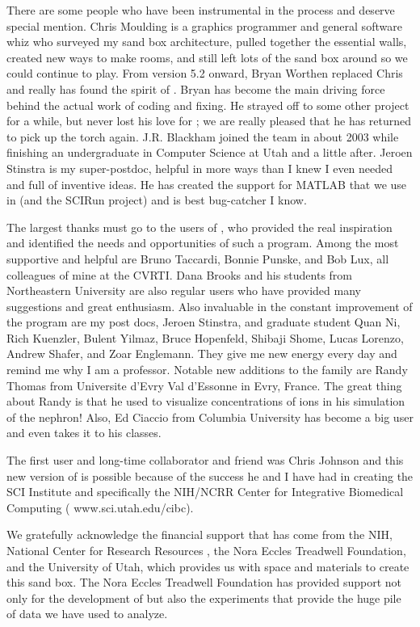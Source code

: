 There are some people who have been instrumental in the process and deserve
special mention.  Chris Moulding is a graphics programmer and general
software whiz who surveyed my sand box architecture, pulled together the
essential walls, created new ways to make rooms, and still left lots of the
sand box around so we could continue to play.  From version 5.2 onward,
Bryan Worthen replaced Chris and really has found the spirit of \map{}.
Bryan has become the main driving force behind the actual work of coding
and fixing.  He strayed off to some other project for a while, but never
lost his love for \map{}; we are really pleased that he has returned to
pick up the torch again. J.R. Blackham joined the team in about 2003 while
finishing an undergraduate in Computer Science at Utah and a little after.
Jeroen Stinstra
is my super-postdoc, helpful in more ways than I knew I even needed and
full of inventive ideas.  He has created the support for MATLAB that we use
in \map{} (and the SCIRun project) and is best bug-catcher I know.

The largest thanks must go to the users of \map{}, who provided the real
inspiration and identified the needs and opportunities of such a program.
Among the most supportive and helpful are Bruno Taccardi, Bonnie Punske,
and Bob Lux, all colleagues of mine at the CVRTI. Dana Brooks and his
students from Northeastern University are also regular users who have
provided many suggestions and great enthusiasm.  Also invaluable in the
constant improvement of the program are my post docs, Jeroen Stinstra, and
graduate student Quan Ni, Rich Kuenzler, Bulent Yilmaz, Bruce Hopenfeld,
Shibaji Shome, Lucas Lorenzo, Andrew Shafer, and Zoar Englemann.  They give
me new energy every day and remind me why I am a professor.  Notable new
additions to the family are Randy Thomas from Universite d'Evry Val
d'Essonne in Evry, France.  The great thing about Randy is that he used
\map{} to visualize concentrations of ions in his simulation of the
nephron!  Also, Ed Ciaccio from Columbia University has become a big user
and even takes it to his classes.

The first user and long-time collaborator and friend was Chris Johnson and
this new version of \map{} is possible because of the success he and I have
had in creating the SCI Institute and specifically the NIH/NCRR Center for
Integrative Biomedical Computing (
{www.sci.utah.edu/cibc}).

We gratefully acknowledge the financial support that has come from the NIH,
National Center for Research Resources
, the Nora Eccles
Treadwell Foundation, and the University of Utah, which provides us with
space and materials to create this sand box.  The Nora Eccles Treadwell
Foundation has provided support not only for the development of \map{} but
also the experiments that provide the huge pile of data we have used \map{}
to analyze.

